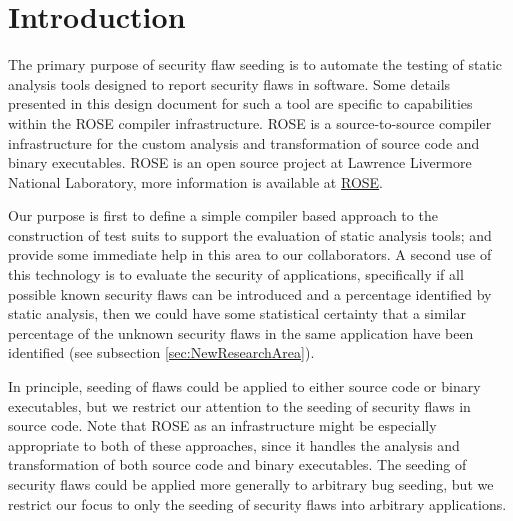 \section{Introduction}


   The primary purpose of security flaw seeding is to automate the testing of static analysis
tools designed to report security flaws in software.  
Some details presented in this design document for such a tool are specific to capabilities
within the ROSE compiler infrastructure.  ROSE is a source-to-source compiler
infrastructure for the custom analysis and transformation of source code and binary 
executables. ROSE is an open source project at Lawrence Livermore National Laboratory, 
more information is available at \href{http://www.roseCompiler.org}{ROSE}.

   Our purpose is first to define a simple compiler based approach to
the construction of test suits to support the evaluation of static analysis
tools; and provide some immediate help in this area to our collaborators.
A second use of this technology is to evaluate the security of 
applications, specifically if all possible known security flaws can be introduced and 
a percentage identified by static analysis, then we could have some statistical
certainty that a similar percentage of the unknown security flaws in the 
same application have been identified (see subsection \ref{sec:NewResearchArea}).

   In principle, seeding of flaws could be applied to either source code or binary
executables, but we restrict our attention to the seeding of security flaws in source
code. Note that ROSE as an infrastructure might be especially appropriate to both of
these approaches, since it handles the analysis and transformation of both source code and binary
executables.  The seeding of security flaws could be applied more generally to arbitrary
bug seeding, but we restrict our focus to only the seeding of security flaws into
arbitrary applications.

